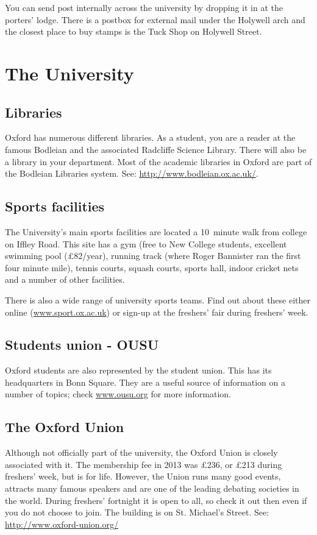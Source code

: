 You can send post internally across the university by dropping it in at the porters' lodge. There is a postbox for external mail under the Holywell arch and the closest place to buy stamps is the Tuck Shop on Holywell Street.

\section{The University}

\subsection{Libraries}
Oxford has numerous different libraries. As a student, you are a reader at the
famous Bodleian and the associated Radcliffe Science Library. There will also be
a library in your department. Most of the academic libraries in Oxford are part of the Bodleian Libraries system. See: \url{http://www.bodleian.ox.ac.uk/}.

\subsection{Sports facilities}
The University's main sports facilities are located a 10~minute walk from
college on Iffley Road. This site has a gym (free to New College students, excellent swimming pool (\pounds82/year), running track (where Roger Bannister ran the first four minute mile), tennis courts, squash courts, sports hall, indoor cricket nets and a number of other facilities.

There is also a wide range of university sports teams. Find out about these
either online (\url{www.sport.ox.ac.uk}) or sign-up at the freshers' fair during
freshers' week.
\subsection{Students union - OUSU}
Oxford students are also represented by the student union. This has its
headquarters in Bonn Square. They are a useful source of information on a number
of topics; check \url{www.ousu.org} for more information.
\subsection{The Oxford Union}
Although not officially part of the university, the Oxford Union is closely
associated with it. The membership fee in 2013 was \pounds236, or \pounds213 during freshers'
week, but is for life. However, the Union runs many good events, attracts many
famous speakers and are one of the leading debating societies in the world. During freshers' fortnight it is open to all, so check it out then even if you do not choose to join. The building is on St. Michael's Street. See: \url{http://www.oxford-union.org/}
